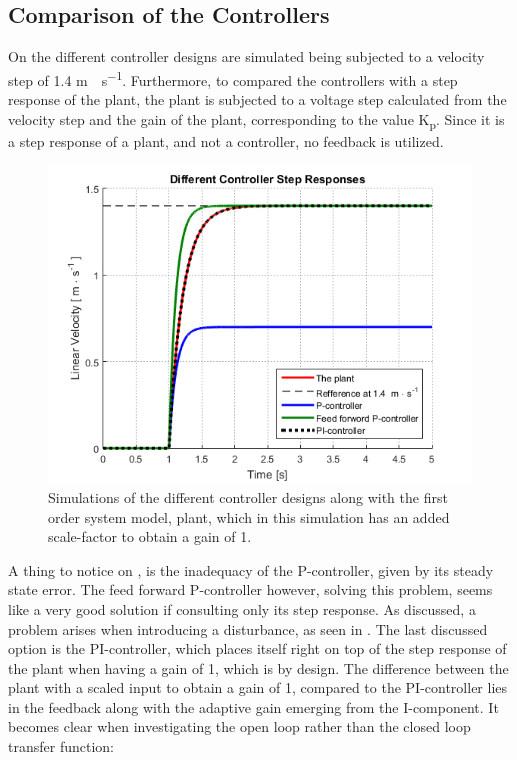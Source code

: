 \subsection{Comparison of the Controllers}
On  the different controller designs are simulated being subjected to a velocity step of 1.4 \si{m \cdot s^{-1}}. Furthermore, to compared the controllers with a step response of the plant, the plant is subjected to a voltage step calculated from the velocity step and the gain of the plant, corresponding to the value \si{K_p}. Since it is a step response of a plant, and not a controller, no feedback is utilized.
%
\begin{figure}[H]
 	\centering
 	\includegraphics[width=.9\textwidth]{figures/ControllerSteps}
 	\caption{Simulations of the different controller designs along with the first order system model, plant, which in this simulation has an added scale-factor to obtain a gain of 1.}
 	\label{fig:ControllerSteps}
 \end{figure}
%
A thing to notice on , is the inadequacy of the P-controller, given by its steady state error. The feed forward P-controller however, solving this problem, seems like a very good solution if consulting only its step response. As discussed, a problem arises when introducing a disturbance, as seen in . The last discussed option is the PI-controller, which places itself right on top of the step response of the plant when having a gain of 1, which is by design. The difference between the plant with a scaled input to obtain a gain of 1, compared to the PI-controller lies in the feedback along with the adaptive gain emerging from the I-component. It becomes clear when investigating the open loop rather than the closed loop transfer function:

